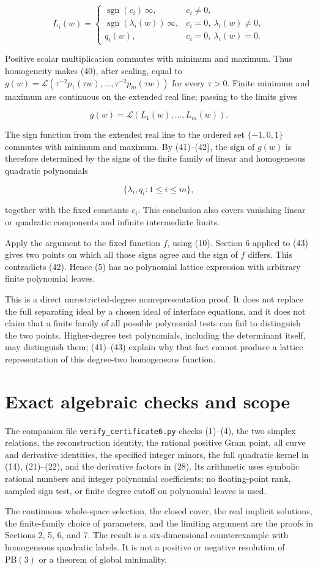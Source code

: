 \documentclass[11pt]{article}
\begin{document}
\[
L_i(w)=
\begin{cases}
\operatorname{sgn}(c_i)\,\infty,&c_i\ne0,\\
\operatorname{sgn}(\lambda_i(w))\,\infty,
     &c_i=0,\ \lambda_i(w)\ne0,\\
q_i(w),&c_i=0,\ \lambda_i(w)=0.
\end{cases}
\tag{41}
\]

Positive scalar multiplication commutes with minimum and maximum. Thus
homogeneity makes (40), after scaling, equal to
\(g(w)=\mathcal L(\tau^{-2}p_1(\tau w),\ldots,\tau^{-2}p_m(\tau w))\)
for every \(\tau>0\). Finite minimum and maximum are continuous on the
extended real line; passing to the limits gives

\[
g(w)=\mathcal L(L_1(w),\ldots,L_m(w)).
\tag{42}
\]

The sign function from the extended real line to the ordered set
\(\{-1,0,1\}\) commutes with minimum and maximum. By (41)--(42), the sign
of \(g(w)\) is therefore determined by the signs of the finite family of
linear and homogeneous quadratic polynomials

\[
\{\lambda_i,q_i:1\le i\le m\},
\tag{43}
\]

together with the fixed constants \(c_i\). This conclusion also covers
vanishing linear or quadratic components and infinite intermediate limits.

Apply the argument to the fixed function \(f\), using (10). Section 6
applied to (43) gives two points on which all those signs agree and the sign
of \(f\) differs. This contradicts (42). Hence (5) has no polynomial lattice
expression with arbitrary finite polynomial leaves.

This is a direct unrestricted-degree nonrepresentation proof. It does not
replace the full separating ideal by a chosen ideal of interface equations,
and it does not claim that a finite family of all possible polynomial tests
can fail to distinguish the two points. Higher-degree test polynomials,
including the determinant itself, may distinguish them; (41)--(43) explain
why that fact cannot produce a lattice representation of this degree-two
homogeneous function.

\section{Exact algebraic checks and scope}

The companion file
\texttt{verify\_certificate6.py} checks (1)--(4), the two
simplex relations, the reconstruction identity, the rational positive Gram
point, all curve and derivative identities, the specified integer minors,
the full quadratic kernel in (14), (21)--(22), and the derivative factors in
(28). Its arithmetic uses symbolic rational numbers and integer polynomial
coefficients; no floating-point rank, sampled sign test, or finite degree
cutoff on polynomial leaves is used.

The continuous whole-space selection, the closed cover, the real implicit
solutions, the finite-family choice of parameters, and the limiting argument
are the proofs in Sections 2, 5, 6, and 7. The result is a six-dimensional
counterexample with homogeneous quadratic labels. It is not a positive or
negative resolution of \(\mathrm{PB}(3)\) or a theorem of global minimality.
\end{document}
